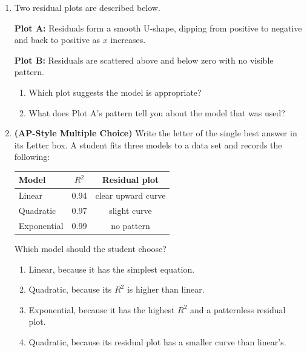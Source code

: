 \documentclass[10pt]{article}
\begin{document}
\begin{enumerate}[itemsep=16pt]
\item Two residual plots are described below.

      \textbf{Plot A:} Residuals form a smooth U-shape, dipping from positive to negative and
      back to positive as $x$ increases.

      \textbf{Plot B:} Residuals are scattered above and below zero with no visible pattern.

      \begin{enumerate}[label=(\alph*), itemsep=6pt]
        \item Which plot suggests the model is appropriate? \smash{\gradedblank[id=hw4a, type=short, check=text, points=1, answer={Plot B}]{3cm}{13pt}}
        \item What does Plot A's pattern tell you about the model that was used?

              \rubricbox[0.04in]{\gradedblank[id=hw4b, type=rubric, points=1,
  display={Wrong function type: it over- and under-predicts in a pattern; use another family.}]{\linewidth}{17pt}}
      \end{enumerate}

\item \textbf{(AP-Style Multiple Choice)} Write the letter of the single best answer in its Letter box. A student fits three models to a data set and records
      the following:

      \begin{center}
      \renewcommand{\arraystretch}{1.3}
      \begin{tabular}{l|c|c}
      \textbf{Model} & \textbf{$R^2$} & \textbf{Residual plot} \\ \hline
      Linear      & 0.94 & clear upward curve \\
      Quadratic   & 0.97 & slight curve \\
      Exponential & 0.99 & no pattern \\
      \end{tabular}
      \end{center}

      Which model should the student choose?

      \medskip
      \begin{enumerate}[label=(\Alph*), itemsep=3pt]
        \item Linear, because it has the simplest equation.
        \item Quadratic, because its $R^2$ is higher than linear.
        \item Exponential, because it has the highest $R^2$ and a patternless residual plot.
        \item Quadratic, because its residual plot has a smaller curve than linear's.
      \end{enumerate}


\end{enumerate}
\end{document}
